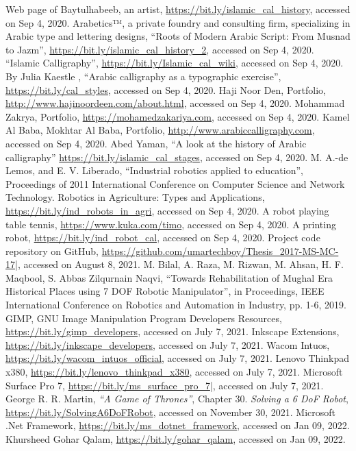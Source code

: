 \begin{thebibliography}{99}
 Web page of Baytulhabeeb, an artist, \url{https://bit.ly/islamic_cal_history}, accessed on Sep 4, 2020.
 Arabetics™, a private foundry and consulting firm, specializing in Arabic type and lettering designs, “Roots of Modern Arabic Script:  From Musnad to Jazm”, \url{https://bit.ly/islamic_cal_history_2}, accessed on Sep 4, 2020.
 “Islamic Calligraphy”, \url{https://bit.ly/Islamic_cal_wiki}, accessed on Sep 4, 2020.
 By Julia Kaestle , “Arabic calligraphy as a typographic exercise”, \url{https://bit.ly/cal_styles}, accessed on Sep 4, 2020.
 Haji Noor Den, Portfolio, \url{http://www.hajinoordeen.com/about.html}, accessed on Sep 4, 2020.
 Mohammad Zakrya, Portfolio, \url{https://mohamedzakariya.com}, accessed on Sep 4, 2020.
 Kamel Al Baba, Mokhtar Al Baba, Portfolio, \url{http://www.arabiccalligraphy.com}, accessed on Sep 4, 2020.
 Abed Yaman, “A look at the history of Arabic calligraphy” \url{https://bit.ly/islamic_cal_stages}, accessed on Sep 4, 2020.
 M. A.-de Lemos, and E. V. Liberado, “Industrial robotics applied to education”, Proceedings of 2011 International Conference on Computer Science and Network Technology.
 Robotics in Agriculture: Types and Applications, \url{https://bit.ly/ind_robots_in_agri}, accessed on Sep 4, 2020.
 A robot playing table tennis, \url{https://www.kuka.com/timo}, accessed on Sep 4, 2020.
 A printing robot, \url{https://bit.ly/ind_robot_cal}, accessed on Sep 4, 2020.
 Project code repository on GitHub, \url{https://github.com/umartechboy/Thesis_2017-MS-MC-17}|, accessed on August 8, 2021.
 M. Bilal, A. Raza, M. Rizwan, M. Ahsan, H. F. Maqbool, S. Abbas Zilqurnain Naqvi, “Towards Rehabilitation of Mughal Era Historical Places using 7 DOF Robotic Manipulator”, in Proceedings, IEEE International Conference on Robotics and Automation in Industry, pp. 1-6, 2019.
 GIMP, GNU Image Manipulation Program Developers Resources, \url{https://bit.ly/gimp_developers}, accessed on July 7, 2021.
 Inkscape Extensions, \url{https://bit.ly/inkscape_developers}, accessed on July 7, 2021.
 Wacom Intuos, \url{https://bit.ly/wacom_intuos_official}, accessed on July 7, 2021.
 Lenovo Thinkpad x380, \url{https://bit.ly/lenovo_thinkpad_x380}, accessed on July 7, 2021.
 Microsoft Surface Pro 7, \url{https://bit.ly/ms_surface_pro_7}|, accessed on July 7, 2021.
 George R. R. Martin, \emph{``A Game of Thrones''}, Chapter $30$.
 \emph{Solving a 6 DoF Robot}, \url{https://bit.ly/SolvingA6DoFRobot}, accessed on November 30, 2021.
 Microsoft .Net Framework, \url{https://bit.ly/ms_dotnet_framework}, accessed on Jan 09, 2022.
 Khursheed Gohar Qalam, \url{https://bit.ly/gohar_qalam}, accessed on Jan 09, 2022.
    \end{thebibliography} 